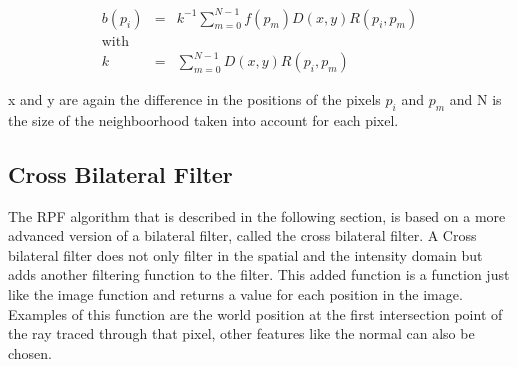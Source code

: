 \begin{equation}
\begin{aligned}
   b(p_i) &=& k^{-1}\sum_{m=0}^{N-1} f(p_m)D(x,y)R(p_i,p_m) \\
   \text{with} \\
   k &=& \sum_{m=0}^{N-1} D(x,y)R(p_i,p_m)
\end{aligned}
\end{equation}

x and y are again the difference in the positions of the pixels $p_i$ and $p_m$ and N is the size of the neighboorhood taken into account for each pixel.


\subsection{Cross Bilateral Filter}
The RPF algorithm that is described in the following section, is based on a more advanced version of a bilateral filter, called the cross bilateral filter.
A Cross bilateral filter does not only filter in the spatial and the intensity domain but adds another filtering function to the filter.
This added function is a function just like the image function and returns a value for each position in the image.
Examples of this function are the world position at the first intersection point of the ray traced through that pixel, other features like the normal can also be chosen.
